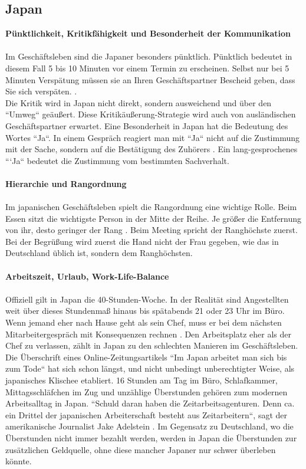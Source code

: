 	\subsection*{Japan}
	\textbf{Pünktlichkeit, Kritikfähigkeit und Besonderheit der Kommunikation}\\
	\\
	Im Geschäftsleben sind die Japaner besonders pünktlich. Pünktlich bedeutet in diesem Fall 5 bis 10 Minuten vor einem Termin zu erscheinen. Selbst nur bei 5 Minuten Verspätung müssen sie an Ihren Geschäftspartner Bescheid geben, dass Sie sich verspäten. \cite{JPKnigge}. \\
	Die Kritik wird in Japan nicht direkt, sondern ausweichend und über den ``Umweg`` geäußert. Diese Kritikäußerung-Strategie wird auch von ausländischen Geschäftspartner erwartet. Eine Besonderheit in Japan hat die Bedeutung des Wortes ``Ja``. In einem Gespräch reagiert man mit ``Ja`` nicht auf die Zustimmung mit der Sache, sondern auf die Bestätigung des Zuhörers \cite{JPKnigge}. Ein lang-gesprochenes ```Ja`` bedeutet die Zustimmung vom bestimmten Sachverhalt.\\
	\\
	\textbf{Hierarchie und Rangordnung}\\
	\\
	Im japanischen Geschäftsleben spielt die Rangordnung eine wichtige Rolle.
	Beim Essen sitzt die wichtigste Person in der Mitte der Reihe. Je größer die Entfernung von ihr, desto geringer der Rang \cite{Business-KniggeFernost}.	
	Beim Meeting spricht der Ranghöchste zuerst. Bei der Begrüßung wird zuerst die Hand nicht der Frau gegeben, wie das in Deutschland üblich ist, sondern dem Ranghöchsten. \\
	\\
	\textbf{Arbeitszeit, Urlaub, Work-Life-Balance}\\
	\\
	Offiziell gilt in Japan die 40-Stunden-Woche. In der Realität sind Angestellten weit über dieses Stundenmaß hinaus bis spätabends 21 oder 23 Uhr im Büro. Wenn jemand eher nach Hause geht als sein Chef, muss er bei dem nächsten Mitarbeitergespräch mit Konsequenzen rechnen \cite{ArbZeitJP}. Den Arbeitsplatz eher als der Chef zu verlassen, zählt in Japan zu den schlechten Manieren im Geschäftsleben.
	Die Überschrift eines Online-Zeitungsartikels ``Im Japan arbeitet man sich bis zum Tode`` hat sich schon längst, und nicht unbedingt unberechtigter Weise, als japanisches Klischee etabliert. 
	16 Stunden am Tag im Büro, Schlafkammer, Mittagsschläfchen im Zug und unzählige Überstunden gehören zum modernen Arbeitsalltag in Japan. ``Schuld daran haben die Zeitarbeitsagenturen. Denn ca. ein Drittel der japanischen Arbeiterschaft besteht aus Zeitarbeitern``, sagt der amerikanische Journalist Jake Adelstein \cite{JPArbeit}. Im Gegensatz zu Deutschland, wo die Überstunden nicht immer bezahlt werden, werden in Japan die Überstunden zur zusätzlichen Geldquelle, ohne diese mancher Japaner nur schwer überleben könnte.
